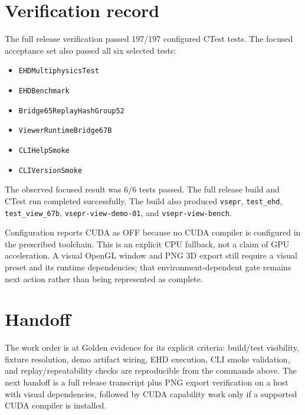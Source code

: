 \documentclass[11pt]{article}
\begin{document}
\section*{Verification record}
The full release verification passed 197/197 configured CTest tests. The
focused acceptance set also passed all six selected tests:
\begin{itemize}[noitemsep]
  \item \texttt{EHDMultiphysicsTest}
  \item \texttt{EHDBenchmark}
  \item \texttt{Bridge65ReplayHashGroup52}
  \item \texttt{ViewerRuntimeBridge67B}
  \item \texttt{CLIHelpSmoke}
  \item \texttt{CLIVersionSmoke}
\end{itemize}
The observed focused result was 6/6 tests passed. The full release build and
CTest run completed successfully. The build also produced
\texttt{vsepr}, \texttt{test\_ehd}, \texttt{test\_view\_67b},
\texttt{vsepr-view-demo-01}, and \texttt{vsepr-view-bench}.

Configuration reports CUDA as OFF because no CUDA compiler is configured in
the prescribed toolchain. This is an explicit CPU fallback, not a claim of GPU
acceleration. A visual OpenGL window and PNG 3D export still require a visual
preset and its runtime dependencies; that environment-dependent gate remains
next action rather than being represented as complete.

\section*{Handoff}
The work order is at Golden evidence for its explicit criteria: build/test
visibility, fixture resolution, demo artifact wiring, EHD execution, CLI
smoke validation, and replay/repeatability checks are reproducible from the
commands above. The next handoff is a full release transcript plus PNG export
verification on a host with visual dependencies, followed by CUDA capability
work only if a supported CUDA compiler is installed.
\end{document}
